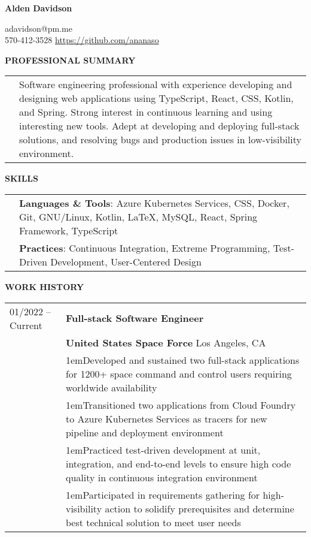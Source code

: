 \documentclass[11pt]{article}
\newlength{\dateColumnWidth}
\newcommand{\customBulletLabel}{\raisebox{0.4ex}{\tiny$\bullet$}}
\newcommand{\detail}{\par\noindent\makebox[1em][l]{\customBulletLabel}\hangindent1em}
\begin{document}
\begin{center}
\begin{minipage}{0.65\textwidth}
	{\Huge\textbf{Alden Davidson}}
\end{minipage}%
\begin{minipage}{0.35\textwidth}
	\raggedleft
	adavidson@pm.me\\
    570-412-3528
    \url{https://github.com/ananaso}
\end{minipage}
\end{center}
{\Large \textbf{PROFESSIONAL SUMMARY}}
\bigbreak
\begin{tabularx}{\textwidth}{@{}p{\dateColumnWidth}X@{}}
    & Software engineering professional with experience developing and designing web applications using TypeScript, React, CSS, Kotlin, and Spring.
    Strong interest in continuous learning and using interesting new tools.
    Adept at developing and deploying full-stack solutions, and resolving bugs and production issues in low-visibility environment.
\end{tabularx}
\bigbreak
{\Large \textbf{SKILLS}}
\bigbreak
\begin{tabularx}{\textwidth}{@{}p{\dateColumnWidth}X@{}}
    & \textbf{Languages \& Tools}: Azure Kubernetes Services, CSS, Docker, Git, GNU/Linux, Kotlin, \LaTeX, MySQL, React, Spring Framework, TypeScript \\
    & \textbf{Practices}: Continuous Integration, Extreme Programming, Test-Driven Development, User-Centered Design \\
\end{tabularx}
\bigbreak
{\Large \textbf{WORK HISTORY}}
\bigbreak
\begin{tabularx}{\textwidth}{@{}p{\dateColumnWidth}X@{}}
    01/2022 -- Current & \textbf{Full-stack Software Engineer} \\
    & \textbf{United States Space Force} \textbar{} Los Angeles, CA \\
    & \detail Developed and sustained two full-stack applications for 1200+ space command and control users requiring worldwide availability \\
    & \detail Transitioned two applications from Cloud Foundry to Azure Kubernetes Services as tracers for new pipeline and deployment environment \\
    & \detail Practiced test-driven development at unit, integration, and end-to-end levels to ensure high code quality in continuous integration environment \\
    & \detail Participated in requirements gathering for high-visibility action to solidify prerequisites and determine best technical solution to meet user needs
\end{tabularx}
\end{document}
